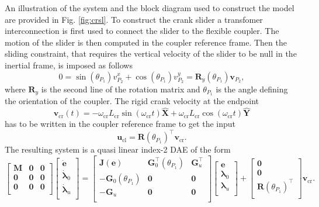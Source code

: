 An illustration of the system and the block diagram used to construct the model are provided in Fig. \ref{fig:crsl}. To construct the crank slider a transfomer interconnection is first used to connect the slider to the flexible coupler. The motion of the slider is then computed in the coupler reference frame. Then the sliding constraint, that requires the vertical velocity of the slider to be null in the inertial frame, is imposed as follows
\[
0 = \sin(\theta_{P_1}) v^x_{P_2} + \cos(\theta_{P_1}) v^y_{P_2} = \mathbf{R}_y(\theta_{P_1}) \mathbf{v}_{P_2},
\]
where $\mathbf{R}_y$ is the second line of the rotation matrix and ${\theta}_{P_1}$ is the angle defining the orientation of the coupler. The rigid crank velocity at the endpoint  
\begin{equation*}
\mathbf{v}_{\text{cr}}(t) = -\omega_{\text{cr}} L _{\text{cr}} \sin(\omega_{\text{cr}} t) \widehat{\mathbf{X}} + \omega_{\text{cr}} L _{\text{cr}} \cos(\omega_{\text{cr}} t) \widehat{\mathbf{Y}}
\end{equation*} 
has to be written in the coupler reference frame to get the input
\begin{equation*}
\mathbf{u}_{\text{cl}} = \mathbf{R}(\theta_{P_1})^\top \mathbf{v}_{\text{cr}}.
\end{equation*}
The resulting system is a quasi linear index-2 DAE of the form
\begin{equation*}
\begin{bmatrix}
\mathbf{M} & \mathbf{0} & \mathbf{0} \\
\mathbf{0} & \mathbf{0} & \mathbf{0} \\
\mathbf{0} & \mathbf{0} & \mathbf{0} \\
\end{bmatrix}
\begin{bmatrix}
\dot{\mathbf{e}} \\ \dot{\bm{\lambda}}_0 \\ \dot{\bm{\lambda}}_u \\
\end{bmatrix}= 
\begin{bmatrix}
\mathbf{J}(\mathbf{e}) & \mathbf{G}_0^\top(\theta_{P_1}) & \mathbf{G}_u^\top \\
-\mathbf{G}_0(\theta_{P_1}) & \mathbf{0} & \mathbf{0} \\
-\mathbf{G}_u & \mathbf{0} & \mathbf{0} \\
\end{bmatrix}
\begin{bmatrix}
\mathbf{e} \\ \bm{\lambda}_0 \\ \bm{\lambda}_u \\
\end{bmatrix} + 
\begin{bmatrix}
\mathbf{0} \\ \mathbf{0} \\ \mathbf{R}(\theta_{P_1})^\top \\
\end{bmatrix}
\mathbf{v}_{\text{cr}}.
\end{equation*}


